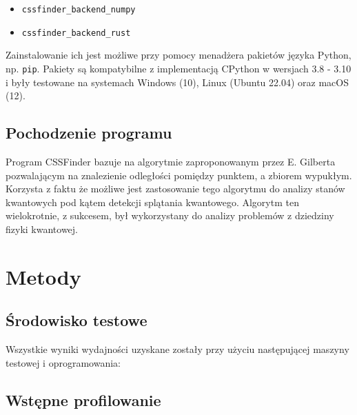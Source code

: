 \documentclass[10pt, a4paper]{article}
\newcommand{\code}[1]{\texttt{#1}}
\begin{document}
\begin{sloppypar}
\begin{itemize}
      \item \code{cssfinder\_backend\_numpy}\cite{CSSFinder_New_Numpy_PyPI}

      \item \code{cssfinder\_backend\_rust}\cite{CSSFinder_New_Rust_PyPI}
    \end{itemize}
    Zainstalowanie ich jest możliwe przy pomocy menadżera pakietów języka Python\cite{Packaging_PEPs},
    np. \code{pip}\cite{PIP}. Pakiety są kompatybilne z implementacją CPython w wersjach
    3.8 - 3.10 i były testowane na systemach Windows (10), Linux (Ubuntu 22.04) oraz macOS
    (12).

    \subsection{Pochodzenie programu}


    Program CSSFinder bazuje na algorytmie zaproponowanym przez E. Gilberta\cite{Lindemann_Gilbert}
    pozwalającym na znalezienie odległości pomiędzy punktem, a zbiorem wypukłym. Korzysta
    z faktu że możliwe jest zastosowanie tego algorytmu do analizy stanów kwantowych pod
    kątem detekcji splątania kwantowego\cite{MW_Hilbert_Schmidt_distance}\cite{MW_Gilbert_Quantum_Entanglement}.
    Algorytm ten wielokrotnie, z sukcesem, był wykorzystany do analizy problemów z
    dziedziny fizyki kwantowej\cite{MW_56_Year_Algorithm}\cite{MW_Variational_approach}.

    \section{Metody}


    \subsection{Środowisko testowe}


    Wszystkie wyniki wydajności uzyskane zostały przy użyciu następującej maszyny
    testowej i oprogramowania:

    \FloatBarrier
    \begin{table}[!ht]
      \centering
      
    \end{table}
    \FloatBarrier

    \subsection{Wstępne profilowanie}



\end{sloppypar}
\end{document}
